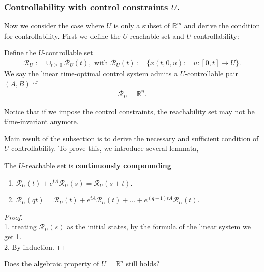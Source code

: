\subsubsection{Controllability with control constraints $U$.}
Now we consider the case where $U$ is only a subset of $\mathbb{R}^m$ and derive the condition for controllability. First we define the $U$ reachable set and $U$-controllability:

\begin{definition}
Define the $U$-controllable set
\begin{align*}
	\mathcal{R}_U := \cup_{t \ge 0} \mathcal{R}_U(t), \text{ with } \mathcal{R}_U(t):= \{ x(t, 0, u): \quad u :[0, t] \rightarrow U\}.
\end{align*}
We say the linear time-optimal control system admits a $U$-controllable pair $(A, B)$ if 
\begin{align*}
	\mathcal{R}_U = \mathbb{R}^n. 
\end{align*}
\end{definition}
\begin{remark}
Notice that if we impose the control constraints, the reachability set may not be time-invariant anymore. 	
\end{remark}

Main result of the subsection is to derive the necessary and sufficient condition of $U$-controllability. To prove this, we introduce several lemmata, 

\begin{lemma}
	The $U$-reachable set is \textbf{continuously compounding}
	\begin{enumerate}
		\item $\mathcal{R}_U(t) + e^{t A} \mathcal{R}_U(s) = \mathcal{R}_U(s + t)$. 
		\item $\mathcal{R}_U(qt) = \mathcal{R}_U(t) + e^{tA}\mathcal{R}_U(t) + \dots + e^{(q - 1)tA} \mathcal{R}_U(t)$. 
	\end{enumerate}
\end{lemma}
\begin{proof}
	\quad\\
	1. treating $\mathcal{R}_U(s)$ as the initial states, by the formula of the linear system we get 1. \\
	2. By induction. 
\end{proof}
\begin{remark}[Question]
	Does the algebraic property of $U = \mathbb{R}^n$ still holds? 
\end{remark}

